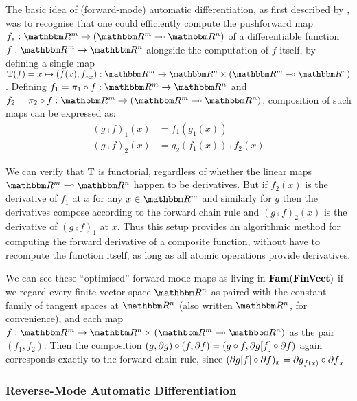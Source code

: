 The basic idea of (forward-mode) automatic differentiation, as first described by \citet{linnainmaa76}, was to
recognise that one could efficiently compute the pushforward map $\pushf{f}: \RR^m \to (\RR^m \linearto
\RR^n)$ of a differentiable function $f: \RR^m \to \RR^n$ alongside the computation of $f$ itself, by defining
a single map $\tangents(f) = x \mapsto (f(x), \pushf{f}_x): \RR^m \to \RR^n \times (\RR^m \linearto \RR^n)$.
Defining $f_1 = \pi_1 \comp f: \RR^m \to \RR^n$ and $f_2 = \pi_2 \comp f: \RR^m \to (\RR^m \linearto \RR^n)$,
composition of such maps can be expressed as:
\begin{align*}
(g \comp f)_1(x) &= f_1(g_1(x)) \\
(g \comp f)_2(x) &= g_2(f_1(x)) \comp f_2(x)
\end{align*}

We can verify that $\mathrm{T}$ is functorial, regardless of whether the linear maps $\RR^m \linearto \RR^n$
happen to be derivatives. But if $f_2(x)$ is the derivative of $f_1$ at $x$ for any $x \in \RR^m$ and
similarly for $g$ then the derivatives compose according to the forward chain rule and $(g \comp f)_2(x)$ is
the derivative of $(g \comp f)_1$ at $x$. Thus this setup provides an algorithmic method for computing the
forward derivative of a composite function, without have to recompute the function itself, as long as all
atomic operations provide derivatives.


We can see these ``optimised'' forward-mode maps as living in $\mathbf{Fam}(\mathbf{FinVect})$ if we regard every finite
vector space $\RR^n$ as paired with the constant family of tangent spaces at $\RR^n$ (also written $\RR^n$,
for convenience), and each map $f: \RR^m \to \RR^n \times (\RR^m \linearto \RR^n)$ as the pair $(f_1, f_2)$.
Then the composition $(g, \partial g) \circ (f, \partial f) = (g \circ f, \partial g[f] \circ
\partial f)$ again corresponds exactly to the forward chain rule, since $(\partial g[f] \circ
\partial f)_x = {\partial g}_{f(x)} \circ {\partial f}_x$


\subsubsection{Reverse-Mode Automatic Differentiation}

